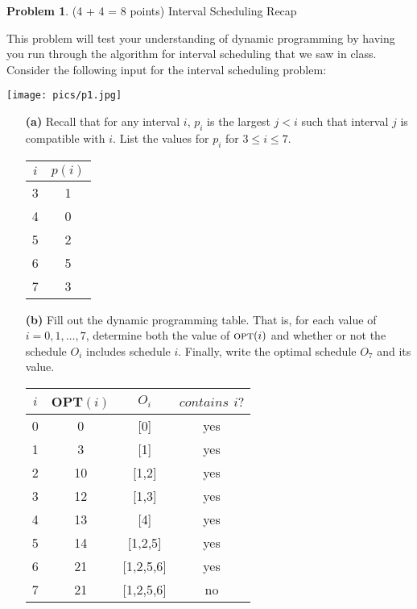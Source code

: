 \documentclass[11pt]{article}
\newcommand{\opt}{\mbox{\textsc{opt}}}
\theoremstyle{definition}
\theoremstyle{theorem}
\newtheorem{prob}{Problem}
\begin{document}
\begin{prob}(4 + 4 = 8 points) Interval Scheduling Recap\end{prob}
This problem will test your understanding of dynamic programming by
having you run through the algorithm for interval scheduling that we
saw in class.  Consider the following input for the interval
scheduling problem:
\begin{center}
	\texttt{[image: pics/p1.jpg]}
\end{center}
\begin{itemize}
\item[{\bf (a)}] Recall that for any interval $i$, $p_i$ is the largest $j < i$ such that interval $j$ is compatible with $i$.  List the values for $p_i$ for $3 \le i \le 7$.

\begin{tabular}{ |c|c| } 
 \hline
 $i$ & $p(i)$ \\ 
 \hline
 3 & 1 \\ 
 4 & 0 \\ 
 5 & 2 \\ 
 6 & 5 \\ 
 7 & 3 \\ 
 \hline
\end{tabular}

\begin{algorithm}[H]
\end{algorithm}

  \item[{\bf (b)}] Fill out the dynamic programming table.  That is,
    for each value of $i = 0, 1, \ldots, 7$, determine both the value
    of $\opt(i)$ and whether or not the schedule $O_i$ includes
    schedule $i$.  Finally, write the optimal schedule $O_7$ and its
    value.
    
\begin{tabular}{ |c|c|c|c| } 
 \hline
 $i$ & OPT$(i)$ & $O_i$ & $contains$ $i?$ \\ 
 \hline
 0 & 0 & [0] & yes \\ 
 1 & 3 & [1] & yes \\ 
 2 & 10 & [1,2] & yes \\
 3 & 12 & [1,3] & yes \\
 4 & 13 & [4] & yes \\
 5 & 14 & [1,2,5] & yes \\
 6 & 21 & [1,2,5,6] & yes \\
 7 & 21 & [1,2,5,6] & no \\
 \hline
\end{tabular}

\end{itemize}
\end{document}
